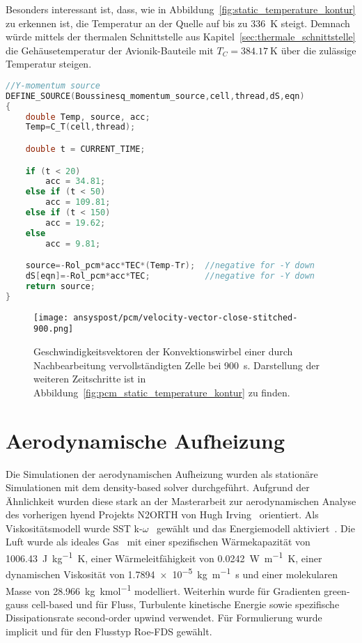 Besonders interessant ist, dass, wie in Abbildung~\ref{fig:static_temperature_kontur} zu erkennen ist, die Temperatur an der Quelle auf bis zu \SI{336}{\kelvin}
steigt. Demnach würde mittels der thermalen Schnittstelle aus Kapitel~\ref{sec:thermale_schnittstelle} die Gehäusetemperatur der Avionik-Bauteile mit
$T_C = \SI{384,17}{\kelvin}$ über die zulässige Temperatur steigen.

\begin{lstlisting}[language=C, float, caption={Boussinesq-Approximation des Auftriebs im \ac{pcm} in der \ac{udf} eicosane.c}, label={lst:udf_bossinesque}]
//Y-momentum source
DEFINE_SOURCE(Boussinesq_momentum_source,cell,thread,dS,eqn)
{
	double Temp, source, acc;
	Temp=C_T(cell,thread);

	double t = CURRENT_TIME;

	if (t < 20)
		acc = 34.81;
	else if (t < 50)
		acc = 109.81;
	else if (t < 150)
		acc = 19.62;
	else
		acc = 9.81;

	source=-Rol_pcm*acc*TEC*(Temp-Tr);  //negative for -Y down
	dS[eqn]=-Rol_pcm*acc*TEC; 			//negative for -Y down
	return source;
}
\end{lstlisting}

\begin{figure}
  \centering
  \texttt{[image: ansyspost/pcm/velocity-vector-close-stitched-900.png]}
  \caption{Geschwindigkeitsvektoren der Konvektionswirbel einer durch Nachbearbeitung vervollständigten Zelle
  bei \SI{900}{\second}. Darstellung der weiteren Zeitschritte ist in Abbildung~\ref{fig:pcm_static_temperature_kontur} zu finden.}\label{fig:pcm_vectoren_stitched}
\end{figure}

\section{Aerodynamische Aufheizung}\label{sec:sim_aerodynamisch}

Die Simulationen der aerodynamischen Aufheizung wurden als stationäre Simulationen mit dem density-based solver durchgeführt.
Aufgrund der Ähnlichkeit wurden diese stark an der Masterarbeit zur aerodynamischen Analyse des vorherigen
\ac{hyend} Projekts N2ORTH von Hugh Irving~\cite{Irving-2021} orientiert.
Als Viskositätsmodell wurde SST k-$\omega$~\cite{Irving-2021} gewählt und das Energiemodell aktiviert~\cite{Irving-2021}.
Die Luft wurde als ideales Gas~\cite{Irving-2021} mit einer spezifischen Wärmekapazität von \SI{1006,43}{\joule\per\kilogram\kelvin},
einer Wärmeleitfähigkeit von \SI{0,0242}{\watt\per\meter\kelvin}, einer dynamischen Viskosität von \SI{1,7894e-5}{\kilogram\per\meter\second}
und einer molekularen Masse von \SI{28,966}{\kilogram\per\kilo\mole} modelliert.
Weiterhin wurde für Gradienten green-gauss cell-based und für Fluss, Turbulente kinetische Energie sowie spezifische Dissipationsrate second-order upwind verwendet.
Für Formulierung wurde implicit und für den Flusstyp Roe-FDS gewählt.

